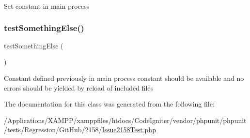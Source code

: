 Set constant in main process \mbox{\label{class_issue2158_test_abcb919247213405c5d20880827d2972d}} 
\subsubsection{\texorpdfstring{test\+Something\+Else()}{testSomethingElse()}}
{\footnotesize\ttfamily test\+Something\+Else (\begin{DoxyParamCaption}{ }\end{DoxyParamCaption})}

Constant defined previously in main process constant should be available and no errors should be yielded by reload of included files

The documentation for this class was generated from the following file\+:\begin{DoxyCompactItemize}
\item 
/\+Applications/\+X\+A\+M\+P\+P/xamppfiles/htdocs/\+Code\+Igniter/vendor/phpunit/phpunit/tests/\+Regression/\+Git\+Hub/2158/\mbox{\hyperlink{_issue2158_test_8php}{Issue2158\+Test.\+php}}\end{DoxyCompactItemize}

